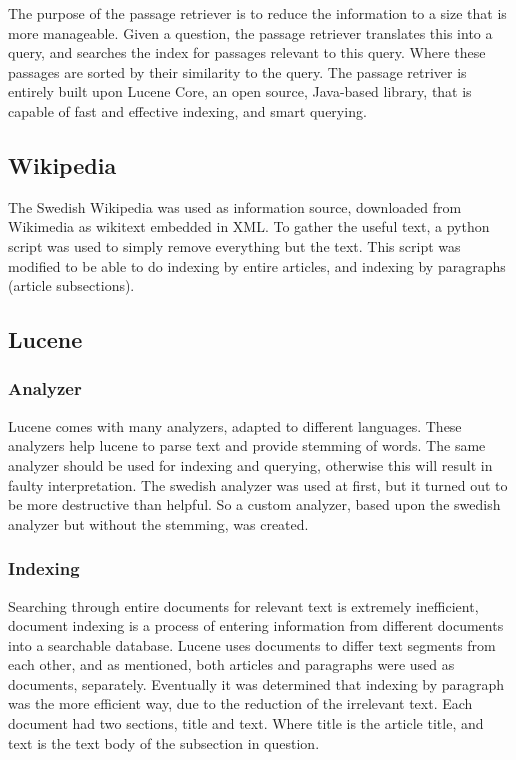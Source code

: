 The purpose of the passage retriever is to reduce the information to a size that is more manageable.
Given a question, the passage retriever translates this into a query, and searches the index for passages 
relevant to this query. Where these passages are sorted by their similarity to the query.
The passage retriver is entirely built upon Lucene Core, an open source, Java-based library, 
that is capable of fast and effective indexing, and smart querying. \cite{lucenecore}

\subsection{Wikipedia}
The Swedish Wikipedia was used as information source, downloaded from Wikimedia \cite{wikimedia} as wikitext embedded in XML.
To gather the useful text, a python script\cite{wikiextractor} was used to simply remove everything but the text. 
This script was modified to be able to do indexing by entire articles, and indexing by paragraphs (article subsections).

\subsection{Lucene}

\subsubsection{Analyzer}
Lucene comes with many analyzers, adapted to different languages. 
These analyzers help lucene to parse text and provide stemming of words.
The same analyzer should be used for indexing and querying, otherwise this will result in faulty interpretation.
The swedish analyzer was used at first, but it turned out to be more destructive than helpful. 
So a custom analyzer, based upon the swedish analyzer but without the stemming, was created.

\subsubsection{Indexing}
Searching through entire documents for relevant text is extremely inefficient, 
document indexing is a process of entering information from different documents into a searchable database. 
Lucene uses documents to differ text segments from each other, and as mentioned, both articles and paragraphs were used as documents, separately.
Eventually it was determined that indexing by paragraph was the more efficient way, due to the reduction of the irrelevant text.
Each document had two sections, title and text. Where title is the article title, and text is the text body of the subsection in question.

